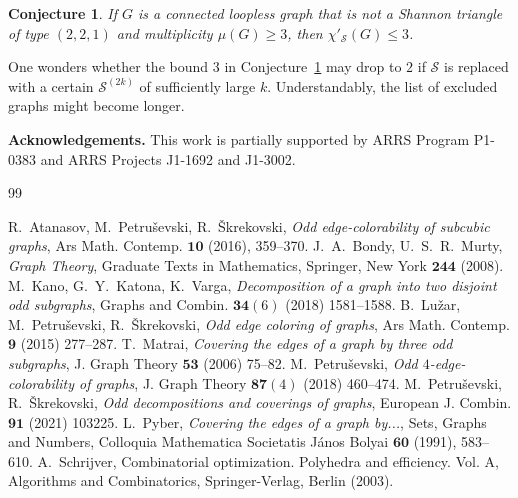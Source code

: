 \documentclass[a4paper,12pt]{article}
\newtheorem{conjecture}[theorem]{Conjecture}
\numberwithin{equation}{section}
\begin{document}
\begin{conjecture}
    \label{conj:3}
If $G$ is a connected loopless graph that is not a Shannon triangle of type $(2,2,1)$ and multiplicity $\mu(G)\geq3$, then $\chi'_{\mathcal{S}}(G)\leq3$.
\end{conjecture}

One wonders whether the bound $3$ in Conjecture~\ref{conj:3} may drop to $2$ if $\mathcal{S}$ is replaced  with a certain $\mathcal{S}^{(2k)}$ of sufficiently large $k$. Understandably, the list of excluded graphs might become longer.







\bigskip
\noindent
{\bf Acknowledgements.}
This work is partially supported by ARRS Program P1-0383 and ARRS Projects J1-1692 and J1-3002.




\begin{thebibliography}{99}

 R.~Atanasov, M.~Petru\v{s}evski, R.~\v{S}krekovski, \textit{Odd edge-colorability of subcubic graphs}, Ars Math. Contemp. $\mathbf{10}$ (2016), 359--370.
 J.~A.~Bondy, U.~S.~R.~Murty, \textit{Graph Theory}, Graduate Texts in Mathematics, Springer, New York $\mathbf{244}$ (2008).
 M.~Kano, G.~Y.~Katona, K.~Varga, \textit{Decomposition of a graph into two disjoint odd subgraphs}, Graphs and Combin. $\mathbf{34}(6)$ (2018) 1581--1588.
 B.~Lu\v{z}ar, M.~Petru\v{s}evski, R.~\v{S}krekovski, \textit{Odd edge coloring of graphs}, Ars Math. Contemp. $\mathbf{9}$ (2015)  277--287.
 T.~Matrai, \textit{Covering the edges of a graph by three odd subgraphs}, J. Graph Theory $\mathbf{53}$ (2006) 75--82.
 M.~Petru\v{s}evski, \textit{Odd $4$-edge-colorability of graphs}, J. Graph Theory $\mathbf{87}(4)$ (2018) 460--474.
 M.~Petru\v{s}evski, R.~\v{S}krekovski, \textit{Odd decompositions and coverings of graphs}, European J. Combin. $\mathbf{91}$ (2021) 103225.
 L.~Pyber, \textit{Covering the edges of a graph by...}, Sets, Graphs and Numbers, Colloquia Mathematica Societatis J\'{a}nos Bolyai $\mathbf{60}$ (1991), 583--610.
 A.~Schrijver, Combinatorial optimization. {P}olyhedra and efficiency. {V}ol. {A}, Algorithms and Combinatorics, Springer-Verlag, Berlin (2003).



\end{thebibliography}
\end{document}
